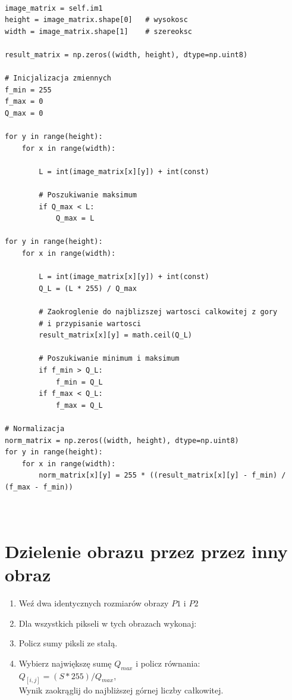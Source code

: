 \documentclass[final,a4paper,openany,12pt]{mwbk}
\begin{document}
\begin{lstlisting}[caption=Dzielenie obrazu szarego przez (zadaną) liczbę ]

image_matrix = self.im1
height = image_matrix.shape[0]   # wysokosc
width = image_matrix.shape[1]    # szereoksc

result_matrix = np.zeros((width, height), dtype=np.uint8)

# Inicjalizacja zmiennych
f_min = 255
f_max = 0
Q_max = 0

for y in range(height):
    for x in range(width):  

        L = int(image_matrix[x][y]) + int(const)

        # Poszukiwanie maksimum
        if Q_max < L:
            Q_max = L

for y in range(height):
    for x in range(width):  

        L = int(image_matrix[x][y]) + int(const)
        Q_L = (L * 255) / Q_max

        # Zaokroglenie do najblizszej wartosci calkowitej z gory
        # i przypisanie wartosci
        result_matrix[x][y] = math.ceil(Q_L)

        # Poszukiwanie minimum i maksimum
        if f_min > Q_L:
            f_min = Q_L
        if f_max < Q_L:
            f_max = Q_L

# Normalizacja
norm_matrix = np.zeros((width, height), dtype=np.uint8)
for y in range(height):
    for x in range(width):
        norm_matrix[x][y] = 255 * ((result_matrix[x][y] - f_min) / (f_max - f_min))
        
        
\end{lstlisting}

\newpage

\section {Dzielenie obrazu przez przez inny obraz}
\vspace{5mm}
	\begin{enumerate}	
		\item Weź dwa identycznych rozmiarów obrazy $P1$ i $P2$
		\item Dla wszystkich pikseli w tych obrazach wykonaj:
		\item Policz sumy piksli ze stałą.
		\item Wybierz największę sumę $Q_{max}$ i policz równania:\\
		$Q_[i,j] = ({S} * 255)/Q_{max}$,\\
		Wynik zaokrąglij do najbliższej górnej liczby całkowitej.
	\end{enumerate}
	
\end{document}
